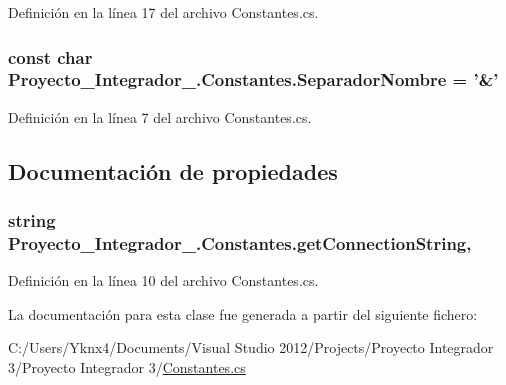 Definición en la línea 17 del archivo Constantes.\-cs.

\hypertarget{class_proyecto___integrador__3_1_1_constantes_a03c73e108b7794395aaa7656837fc36f}{
\subsubsection[{Separador\-Nombre}]{\setlength{\rightskip}{0pt plus 5cm}const char Proyecto\-\_\-\-Integrador\-\_.\-Constantes.\-Separador\-Nombre = '\&'}}\label{class_proyecto___integrador__3_1_1_constantes_a03c73e108b7794395aaa7656837fc36f}


Definición en la línea 7 del archivo Constantes.\-cs.



\subsection{Documentación de propiedades}
\hypertarget{class_proyecto___integrador__3_1_1_constantes_a7682c1c85a193582716237549c3a84a8}{
\subsubsection[{get\-Connection\-String}]{\setlength{\rightskip}{0pt plus 5cm}string Proyecto\-\_\-\-Integrador\-\_.\-Constantes.\-get\-Connection\-String\hspace{0.3cm}{\ttfamily [static]}, {\ttfamily [get]}}}\label{class_proyecto___integrador__3_1_1_constantes_a7682c1c85a193582716237549c3a84a8}


Definición en la línea 10 del archivo Constantes.\-cs.



La documentación para esta clase fue generada a partir del siguiente fichero\-:\begin{DoxyCompactItemize}
\item 
C\-:/\-Users/\-Yknx4/\-Documents/\-Visual Studio 2012/\-Projects/\-Proyecto Integrador 3/\-Proyecto Integrador 3/\hyperlink{_constantes_8cs}{Constantes.\-cs}\end{DoxyCompactItemize}
